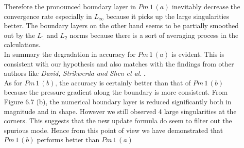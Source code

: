 Therefore the pronounced boundary layer in $Pm\,1\,(a)$ inevitably decrease the convergence rate especially in $L_\infty$ because it picks up the large singularities better. The boundary layers on the other hand seems to be partially smoothed out by the $L_1$ and $L_2$ norms because there is a sort of averaging process in the calculations. \\

In summary the degradation in accuracy for $Pm\,1\,(a)$ is evident. This is consistent with our hypothesis and also matches with the findings from other authors like \emph{David, Strikwerda and Shen et al}. \cite{brown2001accurate, strikwerda1999accuracy, guermond2006overview, guermond2004error}.\\

As for $Pm\,1\,(b)$, the accuracy is certainly better than that of $Pm\,1\,(b)$ because the pressure gradient along the boundary is more consistent. From Figure 6.7 (b), the numerical boundary layer is reduced significantly both in magnitude and in shape. However we still observed 4 large singularities at the corners. This suggests that the new update formula do seem to filter out the spurious mode. Hence from this point of view we have demonstrated that $Pm\,1\,(b)$ performs better than $Pm\,1\,(a)$\\

